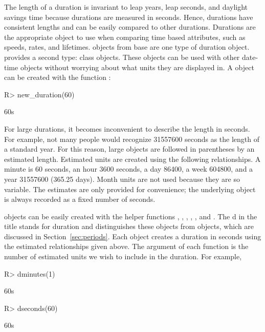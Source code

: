 \documentclass[article]{jss}
\begin{document}
The length of a duration is invariant to leap years, leap seconds, and daylight savings time because durations are measured in seconds. Hence, durations have consistent lengths and can be easily compared to other durations. Durations are the appropriate object to use when comparing time based attributes, such as speeds, rates, and lifetimes.  objects from base  are one type of duration object.  provides a second type:  class objects. These objects can be used with other date-time objects without worrying about what units they are displayed in. A  object can be created with the function :

\begin{CodeInput}
R> new_duration(60)
\end{CodeInput}
\begin{CodeOutput}
[1] 60s
\end{CodeOutput}

For large durations, it becomes inconvenient to describe the length in seconds. For example, not many people would recognize 31557600 seconds as the length of a standard year. For this reason, large  objects are followed in parentheses by an estimated length. Estimated units are created using the following relationships. A minute is 60 seconds, an hour 3600 seconds, a day 86400, a week 604800, and a year 31557600 (365.25 days). Month units are not used because they are so variable. The estimates are only provided for convenience; the underlying object is always recorded as a fixed number of seconds. 

 objects can be easily created with the helper functions 
, , , , , and  . The d in the title stands for duration and distinguishes these objects from  objects, which are discussed in Section~\ref{sec:periods}. Each object creates a duration in seconds using the estimated relationships given above. The argument of each function is the number of estimated units we wish to include in the duration. For example,

\begin{CodeInput}
R> dminutes(1)
\end{CodeInput}
\begin{CodeOutput}
[1] 60s
\end{CodeOutput}

\begin{CodeInput}
R> dseconds(60)
\end{CodeInput}
\begin{CodeOutput}
[1] 60s
\end{CodeOutput}
\end{document}
